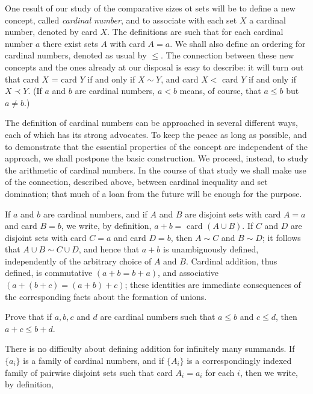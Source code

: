 
One result of our study of the comparative sizes ot sets will be to define a new concept, called \textit{cardinal number}, and to associate with each set $X$ a cardinal number, denoted by card $X$. The definitions are such that for each cardinal number $a$ there exist sets $A$ with card $A = a$. We shall also define an ordering for cardinal numbers, denoted as usual by $\le$. The connection between these new concepts and the ones already at our disposal is easy to describe: it will turn out that card $X$ = card $Y$ if and only if $X \sim Y$, and card $X <$ card $Y$ if and only if $X \prec Y$. (If $a$ and $b$ are cardinal numbers, $a < b$ means, of course, that $a \le b$ but $a \neq b$.)

The definition of cardinal numbers can be approached in several different ways, each of which has its strong advocates. To keep the peace as long as possible, and to demonstrate that the essential properties of the concept are independent of the approach, we shall postpone the basic construction. We proceed, instead, to study the arithmetic of cardinal numbers. In the course of that study we shall make use of the connection, described above, between cardinal inequality and set domination; that much of a loan from the future will be enough for the purpose.

If $a$ and $b$ are cardinal numbers, and if $A$ and $B$ are disjoint sets with card $A = a$ and card $B = b$, we write, by definition, $a + b =$ card $(A \cup B)$. If $C$ and $D$ are disjoint sets with card $C = a$ and card $D = b$, then $A \sim C$ and $B \sim D$; it follows that $A \cup B \sim C \cup D$, and hence that $a + b$ is unambiguously defined, independently of the arbitrary choice of $A$ and $B$. Cardinal addition, thus defined, is commutative $(a + b = b + a)$, and associative $(a + (b + c) = (a + b) + c)$; these identities are immediate consequences of the corresponding facts about the formation of unions.

\begin{exercise} Prove that if $a, b, c$ and $d$ are cardinal numbers such that $a \le b$ and $c \le d$, then $a + c \le b + d$. 
\end{exercise}

There is no difficulty about defining addition for infinitely many summands. If $\{ a_{i} \}$ is a family of cardinal numbers, and if $\{ A_{i} \}$ is a correspondingly indexed family of pairwise disjoint sets such that card $A_{i} = a_{i}$ for each $i$, then we write, by definition,

